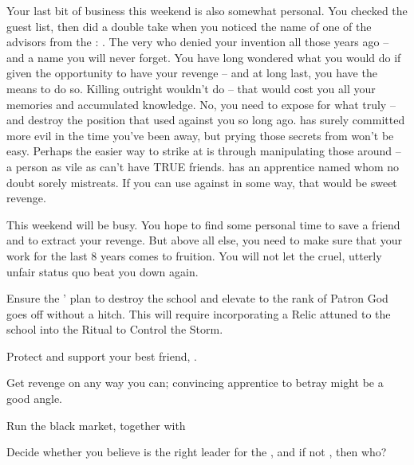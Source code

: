 \documentclass[char]{GL2020}
\begin{document}
Your last bit of business this weekend is also somewhat personal. You checked the guest list, then did a double take when you noticed the name of one of the advisors from the \pTech{}: \cAntiChup{\full}. The very \cAntiChup{\cleric} who denied your invention all those years ago -- and a name you will never forget. You have long wondered what you would do if given the opportunity to have your revenge -- and at long last, you have the means to do so. Killing \cAntiChup{} outright wouldn't do -- that would cost you all your memories and accumulated knowledge. No, you need to expose \cAntiChup{\them} for what \cAntiChup{\they} truly \cAntiChup{\are} -- and destroy the position that \cAntiChup{\they} used against you so long ago. \cAntiChup{} has surely committed more evil in the time you've been away, but prying those secrets from \cAntiChup{\them} won't be easy. Perhaps the easier way to strike at \cAntiChup{\them} is through manipulating those around \cAntiChup{\them} -- a person as vile as \cAntiChup{} can't have TRUE friends. \cAntiChup{} has an apprentice named \cScholarship{\full} whom \cAntiChup{\them} no doubt sorely mistreats. If you can use \cScholarship{\them} against \cAntiChup{\them} in some way, that would be sweet revenge.

This weekend will be busy. You hope to find some personal time to save a friend and to extract your revenge. But above all else, you need to make sure that your work for the last 8 years comes to fruition. You will not let the cruel, utterly unfair status quo beat you down again. 

\begin{itemz}
	\item Ensure the \pGoaties{}' plan to destroy the school and elevate \cGenesis{} to the rank of Patron God goes off without a hitch. This will require incorporating a Relic attuned to the school into the Ritual to Control the Storm.
	\item Protect and support your best friend, \cHeadScientist{}.
	\item Get revenge on \cAntiChup{} any way you can; convincing \cAntiChup{\their} apprentice \cScholarship{} to betray \cAntiChup{\them} might be a good angle.
	\item Run the black market, together with \cChupSecond{}
	\item Decide whether you believe \cChupLeader{} is the right leader for the \pGoaties{}, and if not \cChupLeader{\them}, then who?
\end{itemz}
\end{document}
